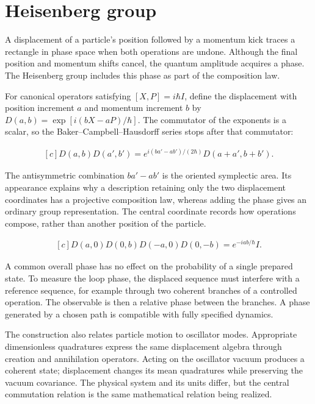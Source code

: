 \documentclass[11pt,oneside]{book}
\newenvironment{centeredalign}{\[\begin{gathered}[c]}{\end{gathered}\]}
\begin{document}
\clearpage

\section{Heisenberg group}

\label{topic:heisenberg-group}

A displacement of a particle's position followed by a momentum kick traces a rectangle in phase space when both operations are undone. Although the final position and momentum shifts cancel, the quantum amplitude acquires a phase. The Heisenberg group includes this phase as part of the composition law.

For canonical operators satisfying \([X,P]=i\hbar I\), define the displacement with position increment \(a\) and momentum increment \(b\) by \(D(a,b)=\exp[i(bX-aP)/\hbar]\). The commutator of the exponents is a scalar, so the Baker--Campbell--Hausdorff series stops after that commutator:

\begin{centeredalign}
D(a,b)D(a',b')=
e^{i(ba'-ab')/(2\hbar)}D(a+a',b+b').
\end{centeredalign}

The antisymmetric combination \(ba'-ab'\) is the oriented symplectic area. Its appearance explains why a description retaining only the two displacement coordinates has a projective composition law, whereas adding the phase gives an ordinary group representation. The central coordinate records how operations compose, rather than another position of the particle.

\begin{centeredalign}
D(a,0)D(0,b)D(-a,0)D(0,-b)=e^{-iab/\hbar}I.
\end{centeredalign}

A common overall phase has no effect on the probability of a single prepared state. To measure the loop phase, the displaced sequence must interfere with a reference sequence, for example through two coherent branches of a controlled operation. The observable is then a relative phase between the branches. A phase generated by a chosen path is compatible with fully specified dynamics.

The construction also relates particle motion to oscillator modes. Appropriate dimensionless quadratures express the same displacement algebra through creation and annihilation operators. Acting on the oscillator vacuum produces a coherent state; displacement changes its mean quadratures while preserving the vacuum covariance. The physical system and its units differ, but the central commutation relation is the same mathematical relation being realized.
\end{document}
